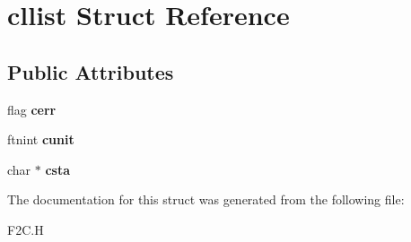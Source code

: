 \hypertarget{structcllist}{\section{cllist Struct Reference}
\label{structcllist}
}
\subsection*{Public Attributes}
\begin{DoxyCompactItemize}
\item 
\hypertarget{structcllist_afce750ad0c1a89568d816ee4c2c40333}{flag {\bfseries cerr}}\label{structcllist_afce750ad0c1a89568d816ee4c2c40333}

\item 
\hypertarget{structcllist_a5ecb27d52d6d1cdccf23f00e6586e4ff}{ftnint {\bfseries cunit}}\label{structcllist_a5ecb27d52d6d1cdccf23f00e6586e4ff}

\item 
\hypertarget{structcllist_a8f52d307fd020ad43a2f2e9a2d665103}{char $\ast$ {\bfseries csta}}\label{structcllist_a8f52d307fd020ad43a2f2e9a2d665103}

\end{DoxyCompactItemize}


The documentation for this struct was generated from the following file\+:\begin{DoxyCompactItemize}
\item 
F2\+C.\+H\end{DoxyCompactItemize}
